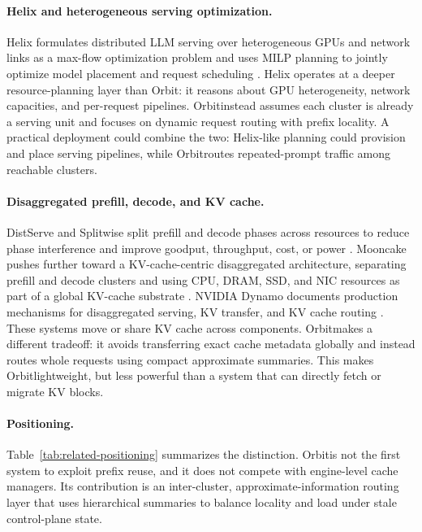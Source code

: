 \documentclass[10pt,twocolumn]{article}
\newcommand{\sys}{Orbit}
\begin{document}
\paragraph{Helix and heterogeneous serving optimization.}
Helix formulates distributed LLM serving over heterogeneous GPUs and network links as a max-flow optimization problem and uses MILP planning to jointly optimize model placement and request scheduling \cite{helix}. Helix operates at a deeper resource-planning layer than \sys: it reasons about GPU heterogeneity, network capacities, and per-request pipelines. \sys instead assumes each cluster is already a serving unit and focuses on dynamic request routing with prefix locality. A practical deployment could combine the two: Helix-like planning could provision and place serving pipelines, while \sys routes repeated-prompt traffic among reachable clusters.

\paragraph{Disaggregated prefill, decode, and KV cache.}
DistServe and Splitwise split prefill and decode phases across resources to reduce phase interference and improve goodput, throughput, cost, or power \cite{distserve,splitwise}. Mooncake pushes further toward a KV-cache-centric disaggregated architecture, separating prefill and decode clusters and using CPU, DRAM, SSD, and NIC resources as part of a global KV-cache substrate \cite{mooncake}. NVIDIA Dynamo documents production mechanisms for disaggregated serving, KV transfer, and KV cache routing \cite{dynamo}. These systems move or share KV cache across components. \sys makes a different tradeoff: it avoids transferring exact cache metadata globally and instead routes whole requests using compact approximate summaries. This makes \sys lightweight, but less powerful than a system that can directly fetch or migrate KV blocks.

\paragraph{Positioning.}
Table~\ref{tab:related-positioning} summarizes the distinction. \sys is not the first system to exploit prefix reuse, and it does not compete with engine-level cache managers. Its contribution is an inter-cluster, approximate-information routing layer that uses hierarchical summaries to balance locality and load under stale control-plane state.
\end{document}
